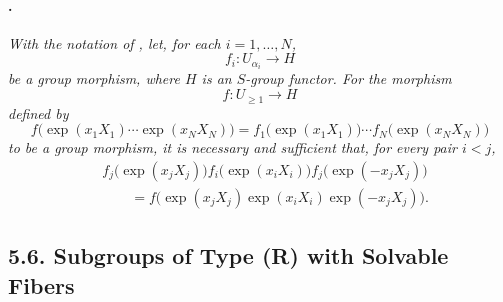 \paragraph{.}
\textit{With the notation of , let, for each
\(i=1,\ldots,N\),}
\[
  f_i:U_{\alpha_i}\longrightarrow H
\]
\textit{be a group morphism, where \(H\) is an \(S\)-group
functor. For the morphism}
\[
  f:U_{\geq1}\longrightarrow H
\]
\textit{defined by}
\[
  f\bigl(
    \exp(x_1X_1)\cdots\exp(x_NX_N)
  \bigr)
  =
  f_1\bigl(\exp(x_1X_1)\bigr)\cdots
  f_N\bigl(\exp(x_NX_N)\bigr)
\]
\textit{to be a group morphism, it is necessary and sufficient
that, for every pair \(i<j\),}
\[
\begin{split}
  &f_j\bigl(\exp(x_jX_j)\bigr)
   f_i\bigl(\exp(x_iX_i)\bigr)
   f_j\bigl(\exp(-x_jX_j)\bigr)\\
  &\qquad =
  f\bigl(
    \exp(x_jX_j)\exp(x_iX_i)\exp(-x_jX_j)
  \bigr).
\end{split}
\]

\subsection*{5.6. Subgroups of Type \textup{(R)} with Solvable
Fibers}

